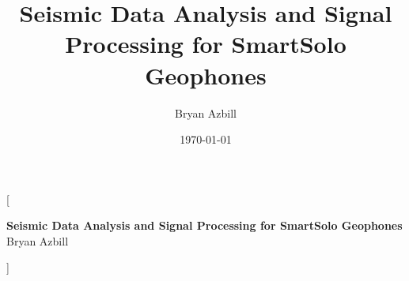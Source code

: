 \documentclass{article}
\title{Seismic Data Analysis and Signal Processing for SmartSolo Geophones}
\author{Bryan Azbill}
\date{\today}
\begin{document}
\twocolumn
[{
\LARGE
\textcolor{titleColor}{\textbf{Seismic Data Analysis and Signal Processing for SmartSolo Geophones}}\vspace{1ex}\\
\large
\textcolor{authorColor}{Bryan Azbill}
\vspace{1ex}
\normalsize
\begin{tcolorbox}[  colback = abstractColor,
                    ,
                    width=\linewidth,
                    arc=1mm, auto outer arc,
                ]
\justifying

\end{tcolorbox}
\vspace{1.5ex}
}]





\newpage
\onecolumn






\begin{appendices}

\end{appendices}
\end{document}
